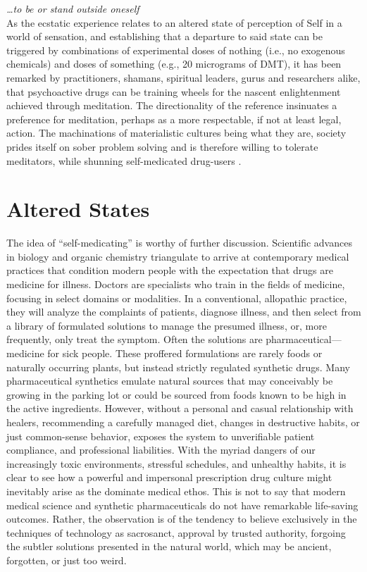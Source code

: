 \documentclass{UIdahoMastersThesis}
\begin{document}
\label{Chapter:EcstaticConsciousness}

\emph{\ldots to be or stand outside oneself}\\

As the ecstatic experience relates to an altered state of perception of Self in a world of sensation, and establishing that a departure to said state can be triggered by combinations of experimental doses of nothing (i.e., no exogenous chemicals) and doses of something (e.g., 20 micrograms of DMT), it has been remarked by practitioners, shamans, spiritual leaders, gurus and researchers alike, that psychoactive drugs can be training wheels for the nascent enlightenment achieved through meditation. The directionality of the reference insinuates a preference for meditation, perhaps as a more respectable, if not at least legal, action. The machinations of materialistic cultures being what they are, society prides itself on sober problem solving and is therefore willing to tolerate meditators, while shunning self-medicated drug-users \cite{noauthor_war_nodate}.

\section{Altered States}


The idea of ``self-medicating'' is worthy of further discussion. Scientific advances in biology and organic chemistry triangulate to arrive at contemporary medical practices that condition modern people with the expectation that drugs are medicine for illness. Doctors are specialists who train in the fields of medicine, focusing in select domains or modalities. In a conventional, allopathic practice, they will analyze the complaints of patients, diagnose illness, and then select from a library of formulated solutions to manage the presumed illness, or, more frequently, only treat the symptom. Often the solutions are pharmaceutical---medicine for sick people. These proffered formulations are rarely foods or naturally occurring plants, but instead strictly regulated synthetic drugs. Many pharmaceutical synthetics emulate natural sources that may conceivably be growing in the parking lot or could be sourced from foods known to be high in the active ingredients. However, without a personal and casual relationship with healers, recommending a carefully managed diet, changes in destructive habits, or just common-sense behavior, exposes the system to unverifiable patient compliance, and professional liabilities. With the myriad dangers of our increasingly toxic environments, stressful schedules, and unhealthy habits, it is clear to see how a powerful and impersonal prescription drug culture might inevitably arise as the dominate medical ethos. This is not to say that modern medical science and synthetic pharmaceuticals do not have remarkable life-saving outcomes. Rather, the observation is of the tendency to believe exclusively in the techniques of technology as sacrosanct, approval by trusted authority, forgoing the subtler solutions presented in the natural world, which may be ancient, forgotten, or just too weird.
\end{document}
